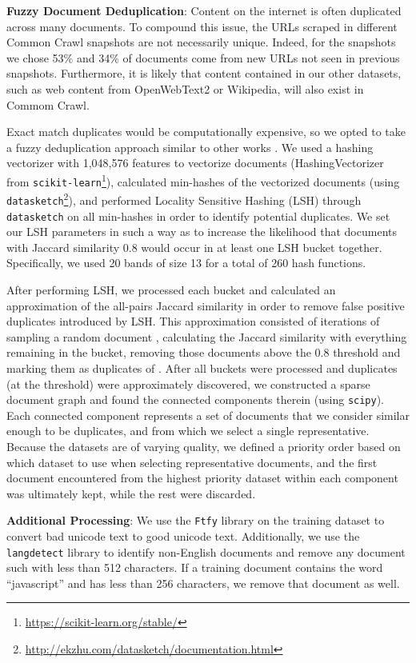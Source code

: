 \documentclass[11pt]{article}
\begin{document}
\textbf{Fuzzy Document Deduplication}: Content on the internet is often duplicated across many documents. To compound this issue, the URLs scraped in different Common Crawl snapshots are not necessarily unique. Indeed, for the snapshots we chose 53\% and 34\% of documents come from new URLs not seen in previous snapshots. Furthermore, it is likely that content contained in our other datasets, such as web content from OpenWebText2 or Wikipedia, will also exist in Commom Crawl.

Exact match duplicates would be computationally expensive,
so we opted to take a fuzzy deduplication approach similar to other works \citep{brown2020language,pile-dataset-2020}. We used a hashing vectorizer with 1,048,576 features to vectorize documents (HashingVectorizer from \texttt{scikit-learn}\footnote{\url{https://scikit-learn.org/stable/}}), calculated min-hashes of the vectorized documents (using \texttt{datasketch}\footnote{\url{http://ekzhu.com/datasketch/documentation.html}}), and performed Locality Sensitive Hashing (LSH) through \texttt{datasketch} on all min-hashes in order to identify potential duplicates. We set our LSH parameters in such a way as to increase the likelihood that documents with Jaccard similarity  0.8 would occur in at least one LSH bucket together. Specifically, we used 20 bands of size 13 for a total of 260 hash functions.

After performing LSH, we processed each bucket and calculated an approximation of the all-pairs Jaccard similarity in order to remove false positive duplicates introduced by LSH. This approximation consisted of  iterations of sampling a random document , calculating the Jaccard similarity with everything remaining in the bucket, removing those documents above the 0.8 threshold and marking them as duplicates of . After all buckets were processed and duplicates (at the threshold) were approximately discovered, we constructed a sparse document graph and found the connected components therein (using \texttt{scipy}). Each connected component represents a set of documents that we consider similar enough to be duplicates, and from which we select a single representative. Because the datasets are of varying quality, we defined a priority order based on which dataset to use when selecting representative documents, and the first document encountered from the highest priority dataset within each component was ultimately kept, while the rest were discarded.

\textbf{Additional Processing}: We use the \texttt{Ftfy} library \cite{speer-2019-ftfy} on the training dataset to convert bad unicode text to good unicode text. Additionally, we use the \texttt{langdetect} \cite{danilk-2021-langdetect} library to identify non-English documents and remove any document such with less than 512 characters. If a training document contains the word ``javascript'' and has less than 256 characters, we remove that document as well. 
\end{document}
